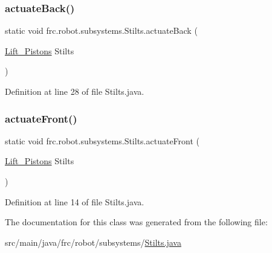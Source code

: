 \subsubsection{\texorpdfstring{actuate\+Back()}{actuateBack()}}
{\footnotesize\ttfamily static void frc.\+robot.\+subsystems.\+Stilts.\+actuate\+Back (\begin{DoxyParamCaption}\item[{\hyperlink{enumfrc_1_1robot_1_1Enums_1_1Lift__Pistons}{Lift\+\_\+\+Pistons}}]{Stilts }\end{DoxyParamCaption})\hspace{0.3cm}{\ttfamily [static]}}



Definition at line 28 of file Stilts.\+java.

\mbox{\label{classfrc_1_1robot_1_1subsystems_1_1Stilts_af50dae1fe4775c73cefb856685f1e99a}} 
\subsubsection{\texorpdfstring{actuate\+Front()}{actuateFront()}}
{\footnotesize\ttfamily static void frc.\+robot.\+subsystems.\+Stilts.\+actuate\+Front (\begin{DoxyParamCaption}\item[{\hyperlink{enumfrc_1_1robot_1_1Enums_1_1Lift__Pistons}{Lift\+\_\+\+Pistons}}]{Stilts }\end{DoxyParamCaption})\hspace{0.3cm}{\ttfamily [static]}}



Definition at line 14 of file Stilts.\+java.



The documentation for this class was generated from the following file\+:\begin{DoxyCompactItemize}
\item 
src/main/java/frc/robot/subsystems/\hyperlink{Stilts_8java}{Stilts.\+java}\end{DoxyCompactItemize}
